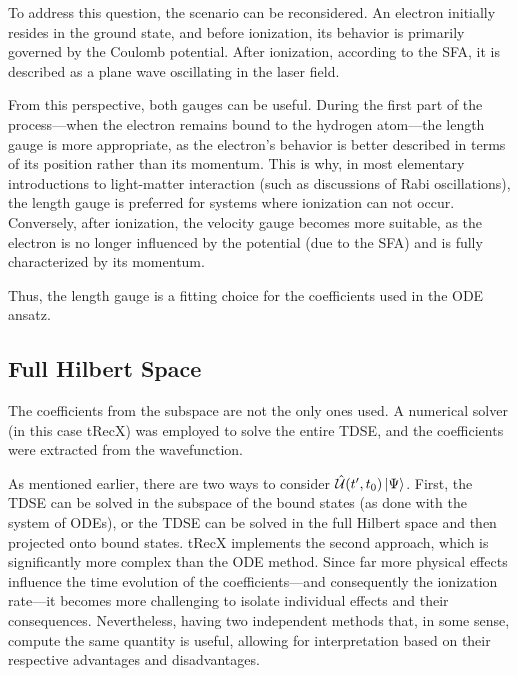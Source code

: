 To address this question, the scenario can be reconsidered.
An electron initially resides in the ground state, and before ionization, its behavior is primarily governed by the Coulomb potential.
After ionization, according to the SFA, it is described as a plane wave oscillating in the laser field.

From this perspective, both gauges can be useful.
During the first part of the process—when the electron remains bound to the hydrogen atom—the length gauge is more appropriate, as the electron's behavior is better described in terms of its position rather than its momentum.
This is why, in most elementary introductions to light-matter interaction (such as discussions of Rabi oscillations), the length gauge is preferred for systems where ionization can not occur.
Conversely, after ionization, the velocity gauge becomes more suitable, as the electron is no longer influenced by the potential (due to the SFA) and is fully characterized by its momentum.

Thus, the length gauge is a fitting choice for the coefficients used in the ODE ansatz.









\subsection{Full Hilbert Space}
The coefficients from the subspace are not the only ones used. A numerical solver (in this case tRecX) was employed to solve the entire TDSE, and the coefficients were extracted from the wavefunction.

As mentioned earlier, there are two ways to consider $\hat{\mathcal{U}}(t',t_0)\ket{\Psi}$.
First, the TDSE can be solved in the subspace of the bound states (as done with the system of ODEs), or the TDSE can be solved in the full Hilbert space and then projected onto bound states.
tRecX implements the second approach, which is significantly more complex than the ODE method.
Since far more physical effects influence the time evolution of the coefficients—and consequently the ionization rate—it becomes more challenging to isolate individual effects and their consequences.
Nevertheless, having two independent methods that, in some sense, compute the same quantity is useful, allowing for interpretation based on their respective advantages and disadvantages.

